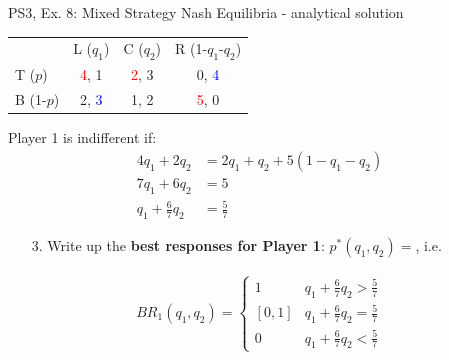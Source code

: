 \begin{frame}{PS3, Ex. 8: Mixed Strategy Nash Equilibria - analytical solution}
  \begin{multicols}{2}
    \begin{table}
      \begin{tabular}{l|c|c|c|}
          \multicolumn{1}{c}{}  & \multicolumn{1}{c}{L ($q_1$)} & \multicolumn{1}{c}{C ($q_2$)} & \multicolumn{1}{c}{R (1-$q_1$-$q_2$)} \\\cline{2-4}
          T ($p$)   & \textcolor{red}{4}, 1 & \textcolor{red}{2}, 3 & 0, \textcolor{blue}{4} \\\cline{2-4}
          B (1-$p$) & 2, \textcolor{blue}{3} & 1, 2 & \textcolor{red}{5}, 0 \\\cline{2-4}
      \end{tabular}
    \end{table}
    Player 1 is indifferent if:
    \begin{align*}
      4q_1 + 2q_2 &= 2q_1 + q_2 + 5(1-q_1-q_2)\\
      7q_1 + 6q_2 &= 5 \\
      q_1 + \frac{6}{7}q_2 &= \frac{5}{7}
    \end{align*}
    \begin{itemize}
      \item[3.] Write up the \textbf{best responses for Player 1}: $p^{*}(q_1,q_2)=$, i.e.
    \end{itemize}
    \begin{align*}
      BR_1(q_1,q_2)=\left\{ \begin{array}{ll}
          1                 & q_1 + \frac{6}{7}q_2 > \frac{5}{7} \\
          \left[0,1\right]  & q_1 + \frac{6}{7}q_2 = \frac{5}{7} \\
          0                 & q_1 + \frac{6}{7}q_2 < \frac{5}{7}
      \end{array}\right.
    \end{align*}
  \vfill\null \columnbreak
  \vfill\null
  \end{multicols}
\end{frame}
